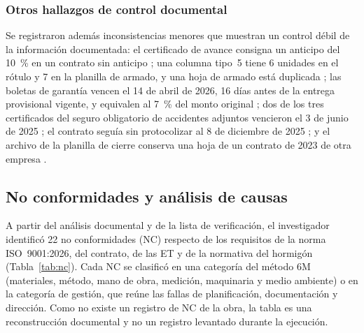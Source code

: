 \subsubsection{Otros hallazgos de control documental}
Se registraron además inconsistencias menores que muestran un control débil de la información documentada: el certificado de avance consigna un anticipo del 10~\% en un contrato sin anticipo \parencite[p.~14]{uatf2025pao2}; una columna tipo~5 tiene 6 unidades en el rótulo y 7 en la planilla de armado, y una hoja de armado está duplicada \parencite[pp.~38, 51--52]{uatf2025pao2}; las boletas de garantía vencen el 14 de abril de 2026, 16 días antes de la entrega provisional vigente, y equivalen al 7~\% del monto original \parencite[pp.~130--131]{uatf2025pao2}; dos de los tres certificados del seguro obligatorio de accidentes adjuntos vencieron el 3 de junio de 2025 \parencite[pp.~134--135]{uatf2025pao2}; el contrato seguía sin protocolizar al 8 de diciembre de 2025 \parencite[p.~88]{uatf2025pao2}; y el archivo de la planilla de cierre conserva una hoja de un contrato de 2023 de otra empresa \parencite{uatf_pao3}.

\subsection{No conformidades y análisis de causas}
\label{sec:nc-causas}

A partir del análisis documental y de la lista de verificación, el investigador identificó 22 no conformidades (NC) respecto de los requisitos de la norma ISO~9001:2026, del contrato, de las ET y de la normativa del hormigón (Tabla~\ref{tab:nc}). Cada NC se clasificó en una categoría del método 6M (materiales, método, mano de obra, medición, maquinaria y medio ambiente) o en la categoría de gestión, que reúne las fallas de planificación, documentación y dirección. Como no existe un registro de NC de la obra, la tabla es una reconstrucción documental y no un registro levantado durante la ejecución.


